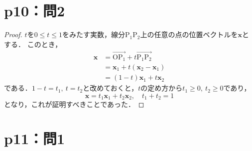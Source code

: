 \documentclass[a4paper,10pt,fleqn]{ltjsarticle}
\begin{document}
\section*{p10：問2}

\begin{tleftbar}
    \begin{proof}
        $t$を$0 \le t \le 1$をみたす実数，線分$\mathrm{P_1 P_2}$上の任意の点の位置ベクトルを$\bm{x}$とする．
        このとき，
        \begin{align*}
            \bm{x} & = \overrightarrow{\mathrm{O P_1}}+t\overrightarrow{\mathrm{P_1 P_2}} \\
                   & = \bm{x}_1 + t (\bm{x}_2 - \bm{x}_1)                                 \\
                   & = (1-t) \bm{x}_1 + t \bm{x}_2
        \end{align*}
        である．$1-t = t_1,~t=t_2$と改めておくと，$t$の定め方から$t_1 \ge 0,~t_2 \ge 0$であり，
        \[
            \bm{x}= t_1 \bm{x}_1 + t_2 \bm{x}_2 ,\quad t_1 + t_2 =1
        \]
        となり，これが証明すべきことであった．
    \end{proof}
\end{tleftbar}

\newpage
\section*{p11：問1}
\end{document}
